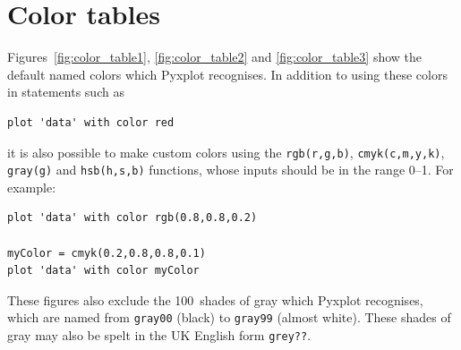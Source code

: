 %
%
%
%
%



\chapter{Color tables}
\label{ch:color_charts}

 Figures~\ref{fig:color_table1}, \ref{fig:color_table2}
and \ref{fig:color_table3} show the default named colors which Pyxplot recognises.
In addition to using these colors in statements such as

\begin{verbatim}
plot 'data' with color red
\end{verbatim}

\noindent it is also possible to make custom colors using the {\tt rgb(r,g,b)},
{\tt cmyk(c,m,y,k)}, {\tt gray(g)} and {\tt hsb(h,s,b)} functions, whose inputs
should be in the range 0--1. For example:

\begin{verbatim}
plot 'data' with color rgb(0.8,0.8,0.2)

myColor = cmyk(0.2,0.8,0.8,0.1)
plot 'data' with color myColor
\end{verbatim}

These figures also exclude the 100~shades of gray which Pyxplot recognises,
which are named from {\tt gray00} (black) to {\tt gray99} (almost white).
These shades of gray may also be spelt in the UK English form {\tt grey??}.

